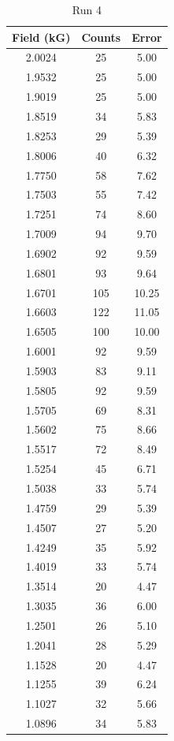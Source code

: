 \begin{table}
\caption{Run 4}
\begin{tabular}{|c|c|c|} \hline
Field (kG)	&	Counts	&	Error	\\ \hline
2.0024	&	25	&	5.00	\\ \hline
1.9532	&	25	&	5.00	\\ \hline
1.9019	&	25	&	5.00	\\ \hline
1.8519	&	34	&	5.83	\\ \hline
1.8253	&	29	&	5.39	\\ \hline
1.8006	&	40	&	6.32	\\ \hline
1.7750	&	58	&	7.62	\\ \hline
1.7503	&	55	&	7.42	\\ \hline
1.7251	&	74	&	8.60	\\ \hline
1.7009	&	94	&	9.70	\\ \hline
1.6902	&	92	&	9.59	\\ \hline
1.6801	&	93	&	9.64	\\ \hline
1.6701	&	105	&	10.25	\\ \hline
1.6603	&	122	&	11.05	\\ \hline
1.6505	&	100	&	10.00	\\ \hline
1.6001	&	92	&	9.59	\\ \hline
1.5903	&	83	&	9.11	\\ \hline
1.5805	&	92	&	9.59	\\ \hline
1.5705	&	69	&	8.31	\\ \hline
1.5602	&	75	&	8.66	\\ \hline
1.5517	&	72	&	8.49	\\ \hline
1.5254	&	45	&	6.71	\\ \hline
1.5038	&	33	&	5.74	\\ \hline
1.4759	&	29	&	5.39	\\ \hline
1.4507	&	27	&	5.20	\\ \hline
1.4249	&	35	&	5.92	\\ \hline
1.4019	&	33	&	5.74	\\ \hline
1.3514	&	20	&	4.47	\\ \hline
1.3035	&	36	&	6.00	\\ \hline
1.2501	&	26	&	5.10	\\ \hline
1.2041	&	28	&	5.29	\\ \hline
1.1528	&	20	&	4.47	\\ \hline
1.1255	&	39	&	6.24	\\ \hline
1.1027	&	32	&	5.66	\\ \hline
1.0896	&	34	&	5.83	\\ \hline

\end{tabular}
\end{table}
